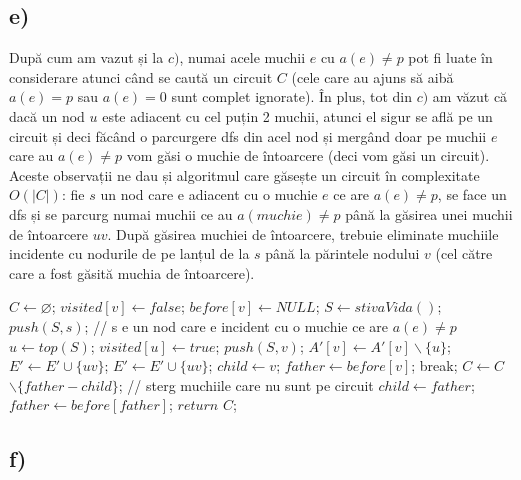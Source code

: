 \documentclass[a4paper,12pt]{article}
\begin{document}
\subsection{e)}

După cum am vazut și la $c)$, numai acele muchii $e$ cu $a(e) \neq p$ pot fi luate în considerare atunci când se caută un circuit $C$ (cele care au ajuns să aibă $a(e) = p$ sau $a(e) = 0$ sunt complet ignorate). În plus, tot din $c)$ am văzut că dacă un nod $u$ este adiacent cu cel puțin 2 muchii, atunci el sigur se află pe un circuit și deci făcând o parcurgere dfs din acel nod și mergând doar pe muchii $e$ care au $a(e) \neq p$ vom găsi o muchie de întoarcere (deci vom găsi un circuit). Aceste observații ne dau și algoritmul care găsește un circuit în complexitate $O(|C|)$: fie $s$ un nod care e adiacent cu o muchie $e$ ce are $a(e) \neq p$, se face un dfs și se parcurg numai muchii ce au $a(muchie) \neq p$ până la găsirea unei muchii de întoarcere $uv$. După găsirea muchiei de întoarcere, trebuie eliminate muchiile incidente cu nodurile de pe lanțul de la $s$ până la părintele nodului $v$ (cel către care a fost găsită muchia de întoarcere). 

\begin{algorithm}
	\begin{algorithmic}[1]
		\State $C \gets \varnothing$;
				\State $visited[v] \gets false$;
				\State $before[v] \gets NULL$;
		\EndFor
		\State $S \gets stivaVida()$;
		\State $push(S,s)$; // s e un nod care e incident cu o muchie ce are $a(e) \neq p$
			\State $ u \gets top(S)$;
			\State $ visited[u] \gets true$;
					\State $push(S,v)$;
					\State $A'[v] \gets A'[v] \backslash \{u\}$;
					\State $E' \gets E' \cup \{uv\}$;
				\Else
					\State $E' \gets E' \cup \{uv\}$;
					\State $child \gets v$;
					\State $father \gets before[v]$;
					\State break;
				\EndIf
			\EndIf
		\EndWhile
			\State $C \gets C$  $\backslash \{father-child\}$; // sterg muchiile care nu sunt pe circuit
			\State $ child \gets father$; $father \gets before[father]$;
		\EndWhile
		\State $return$ $C$;
	\end{algorithmic}
\end{algorithm}	

\subsection{f)}
\end{document}

